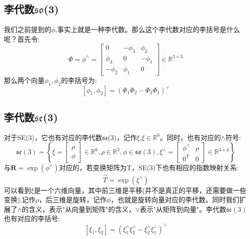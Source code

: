 \subsection{李代数$\mathfrak{so}$(3)}
我们之前提到的$\phi$,事实上就是一种李代数。那么这个李代数对应的李括号是什么呢？首先令:
\begin{equation}
	\Phi=\phi^{\wedge}=\left[ \begin{array}{ccc}{0} & {-\phi_{3}} & {\phi_{2}} \\ {\phi_{3}} & {0} & {-\phi_{1}} \\ {-\phi_{2}} & {\phi_{1}} & {0}\end{array}\right] \in \mathbb{R}^{3 \times 3}
\end{equation}
那么两个向量$\phi_{1},\phi_{2}$的李括号为:
\begin{equation}
\left[\phi_{1}, \phi_{2}\right]=\left(\Phi_{1} \Phi_{2}-\Phi_{2} \Phi_{1}\right)^\vee
\end{equation}

\subsection{李代数$\mathfrak{se}$(3)}
对于SE(3)，它也有对应的李代数$\mathfrak{se}$(3)，记作$\xi$,$\xi \in \mathbb{R}^6$。同时，也有对应的$\wedge$符号:
\begin{equation}
\mathfrak{se}(3)=\left\{
	\xi=\left[ \begin{array}{l}{\rho} \\ {\phi}\end{array}\right] \in \mathbb{R}^{6},\rho \in \mathbb{R}^{3},\phi \in \mathfrak{so}(3),\xi^{\wedge}=\left[ \begin{array}{ll}{\phi^{\wedge}} & {\rho} \\ {0^{T}} & {0}\end{array}\right] \in \mathbb{R}^{4\times4}
	\right\}
\end{equation}
与$\boldsymbol{R}=\exp \left(\phi^{\wedge}\right)$对应的，若变换矩阵为T，SE(3)下也有相应的指数映射关系:
\begin{equation}
	\vec{T}=\exp(\xi^\wedge)
\end{equation}
可以看到$\xi$是一个六维向量，其中前三维是平移(并不是真正的平移，还需要做一些变换),记作$\rho$，后三维是旋转，记作$\phi$，也就是旋转向量对应的李代数。同时我们扩展了$\wedge$的含义，表示"从向量到矩阵"的含义，$\vee$表示"从矩阵到向量"。李代数$\mathfrak{se}(3)$也有对应的李括号:
\begin{equation}
\left[\xi_{1}, \xi_{2}\right]=\left(\xi_{1}^\wedge \xi_{2}^\wedge-\xi_{2}^\wedge \xi_{1}^\wedge\right)^{\vee}
\end{equation}
